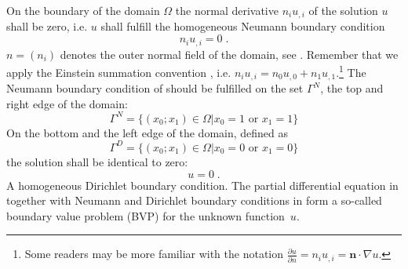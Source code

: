 On the boundary of the domain $\Omega$ the normal derivative $n_{i} u_{,i}$
of the solution $u$ shall be zero, i.e. $u$ shall fulfill
the homogeneous Neumann boundary condition
\begin{equation}
n_{i} u_{,i}= 0 \;.
\label{eq:FirstSteps.2}
\end{equation}
$n=(n_{i})$ denotes the outer normal field
of the domain, see . Remember that we 
apply the Einstein summation convention , i.e. $n_{i} u_{,i}= n_{0} u_{,0} +%
n_{1} u_{,1}$.\footnote{Some readers may be more familiar with the
notation $\frac{\partial u}{\partial n} = n_{i} u_{,i}=\mathbf{n}\cdot \nabla u$.}
The Neumann boundary condition of  should be fulfilled on the
set $\Gamma^N$, the top and right edge of the domain:
\begin{equation}
    \Gamma^N=\{(x_0;x_1) \in \Omega | x_{0}=1 \mbox{ or } x_{1}=1  \}
    \label{eq:FirstSteps.2b}
\end{equation}
On the bottom and the left edge of the domain, defined
as 
\begin{equation}
    \Gamma^D=\{(x_0;x_1) \in \Omega | x_{0}=0 \mbox{ or } x_{1}=0  \}
    \label{eq:FirstSteps.2c}
\end{equation}
the solution shall be identical to zero:
\begin{equation}
    u=0 \; .
    \label{eq:FirstSteps.2d}
\end{equation}
A homogeneous Dirichlet boundary
condition.
The partial differential equation in  together
with Neumann   and 
Dirichlet boundary conditions in  form a so-called
boundary value
problem (BVP)
for the unknown function~$u$. 

